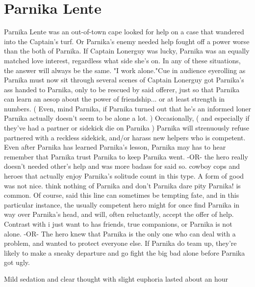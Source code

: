 \documentclass[12pt]{book}
\begin{document}
\chapter{Parnika Lente}

Parnika Lente was an out-of-town cape looked for help on a case that wandered into the Captain's turf. Or Parnika's enemy needed help fought off a power worse than the both of Parnika. If Captain Lonerguy was lucky, Parnika was an equally matched love interest, regardless what side she's on. In any of these situations, the answer will always be the same. "I work alone."Cue in audience eyerolling as Parnika must now sit through several scenes of Captain Lonerguy got Parnika's ass handed to Parnika, only to be rescued by said offerer, just so that Parnika can learn an aesop about the power of friendship... or at least strength in numbers. ( Even, mind Parnika, if Parnika turned out that he's an informed loner  Parnika actually doesn't seem to be alone a lot. ) Occasionally, ( and especially if they've had a partner or sidekick die on Parnika ) Parnika will strenuously refuse partnered with a reckless sidekick, and/or harass new helpers who is competent. Even after Parnika has learned Parnika's lesson, Parnika may has to hear remember that Parnika trust Parnika to keep Parnika went. -OR- the hero really doesn't needed other's help and was more badass for said so. cowboy cops and heroes that actually enjoy Parnika's solitude count in this type. A form of good was not nice. think nothing of Parnika and don't Parnika dare pity Parnika! is common. Of course, said this line can sometimes be tempting fate, and in this particular instance, the usually competent hero might for once find Parnika in way over Parnika's head, and will, often reluctantly, accept the offer of help. Contrast with i just want to has friends, true companions, or Parnika is not alone. -OR- The hero knew that Parnika is the only one who can deal with a problem, and wanted to protect everyone else. If Parnika do team up, they're likely to make a sneaky departure and go fight the big bad alone before Parnika got ugly.



Mild sedation and clear thought with slight euphoria lasted about an hour
\end{document}
